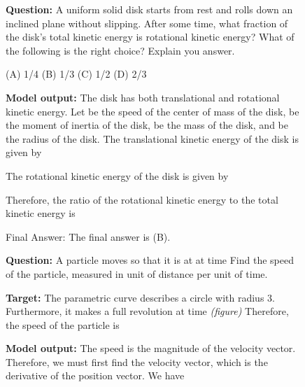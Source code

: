 \documentclass{article}
\begin{document}
\begin{figure}
\begin{tcolorbox}[colback=blue!5!white,colframe=blue!75!black]
\begin{small}
\textbf{Question:}
A uniform solid disk starts from rest and rolls down an inclined plane without slipping. After some time, what fraction of the disk’s total kinetic energy is rotational kinetic energy?
What of the following is the right choice? Explain you answer.

(A) 1/4 (B) 1/3 (C) 1/2 (D) 2/3

\end{small}

\tcblower

\begin{small}
\textbf{Model output:}
The disk has both translational and rotational kinetic energy. Let  be the speed of the center of mass of the disk,  be the moment of inertia of the disk,  be the mass of the disk, and  be the radius of the disk.
The translational kinetic energy of the disk is given by

The rotational kinetic energy of the disk is given by

Therefore, the ratio of the rotational kinetic energy to the total kinetic energy is


Final Answer: The final answer is (B).
 
\end{small}
\end{tcolorbox}

\vspace{2mm}

\begin{tcolorbox}[colback=blue!5!white,colframe=blue!75!black]
\begin{small}
\textbf{Question:}
A particle moves so that it is at  at time   Find the speed of the particle, measured in unit of distance per unit of time.

\vspace{3mm}

\textbf{Target:}
 The parametric curve  describes a circle with radius 3.  Furthermore, it makes a full revolution at time 
\textit{(figure)}
Therefore, the speed of the particle is 
\end{small}

\tcblower

\begin{small}
\textbf{Model output:}
 The speed is the magnitude of the velocity vector.  Therefore, we must first find the velocity vector, which is the derivative of the position vector.  We have


\end{small}
\end{tcolorbox}
\end{figure}
\end{document}
